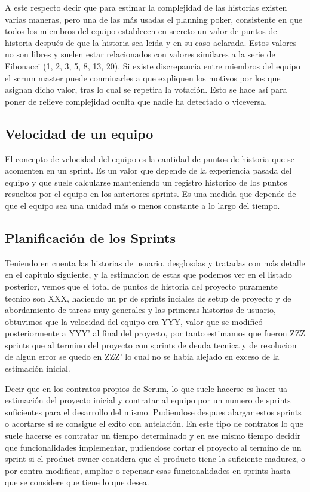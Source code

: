 \documentclass[../pfc.tex]{subfiles}
\begin{document}
	A este respecto decir que para estimar la complejidad de las historias existen varias maneras, pero una de las más usadas el planning poker, consistente en que todos los miembros del equipo establecen en secreto un valor de puntos de historia después de que la historia sea leida y en su caso aclarada. Estos valores no son libres y suelen estar relacionados con valores similares a la serie de Fibonacci (1, 2, 3, 5, 8, 13, 20). Si existe discrepancia entre miembros del equipo el scrum master puede conminarles a que expliquen los motivos por los que asignan dicho valor, tras lo cual se repetira la votación. Esto se hace así para poner de relieve complejidad oculta que nadie ha detectado o viceversa.
	
	\subsection{Velocidad de un equipo}
	
	El concepto de velocidad del equipo es la cantidad de puntos de historia que se acomenten en un sprint. Es un valor que depende de la experiencia pasada del equipo y que suele calcularse manteniendo un registro historico de los puntos resueltos por el equipo en los anteriores sprints. Es una medida que depende de que el equipo sea una unidad más o menos constante a lo largo del tiempo. 
	
	\subsection{Planificación de los Sprints}   
	
	Teniendo en cuenta las historias de usuario, desglosdas y tratadas con más detalle en el capitulo siguiente, y la estimacion de estas que podemos ver en el listado posterior, vemos que el total de puntos de historia del proyecto puramente tecnico son XXX, haciendo un pr de sprints inciales de setup de proyecto y de abordamiento de tareas muy generales y las primeras historias de usuario, obtuvimos que la velocidad del equipo era YYY, valor que se modificó posteriormente a YYY' al final del proyecto, por tanto estimamos que fueron ZZZ sprints que al termino del proyecto con sprints de deuda tecnica y de resolucion de algun error se quedo en ZZZ' lo cual no se habia alejado en exceso de la estimación inicial. 
	
	Decir que en los contratos propios de Scrum, lo que suele hacerse es hacer ua estimación del proyecto inicial y contratar al equipo por un numero de sprints suficientes para el desarrollo del mismo. Pudiendose despues alargar estos sprints o acortarse si se consigue el exito con antelación. En este tipo de contratos lo que suele hacerse es contratar un tiempo determinado y en ese mismo tiempo decidir que funcionalidades implementar, pudiendose cortar el proyecto al termino de un sprint si el product owner considera que el producto tiene la suficiente madurez, o por contra modificar, ampliar o repensar esas funcionalidades en sprints hasta que se considere que tiene lo que desea. 
	
\end{document}
